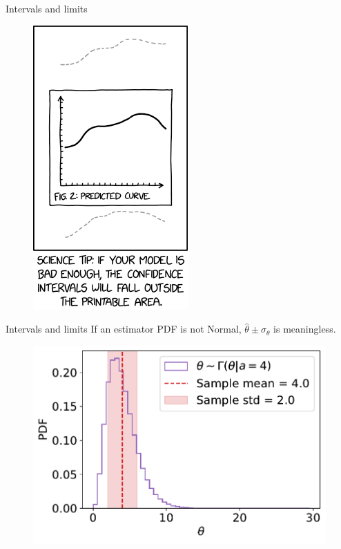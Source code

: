 \documentclass[
aspectratio=169,
14pt,
professionalfonts
]{beamer}
\begin{document}
\begin{frame}{Intervals and limits}
\begin{figure}
    \centering
    \includegraphics[width=0.25\linewidth]{../plots/confidence_interval.png}
\end{figure}
\end{frame}

\begin{frame}{Intervals and limits}
If an estimator PDF is not Normal, $\hat \theta \pm \sigma_\theta$ is meaningless.

\begin{figure}
    \centering
    \includegraphics[width=0.6\linewidth]{../plots/gamma.pdf}
\end{figure}
\end{frame}
\end{document}
